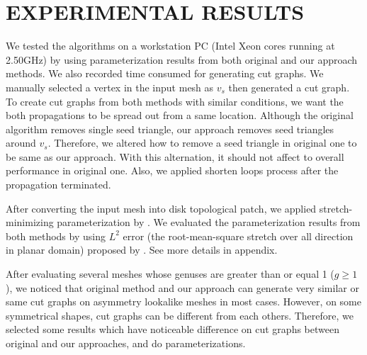 \documentclass[a4paper,twoside]{article}
\begin{document}
\section{\uppercase{Experimental Results}}
\label{sec:Experiment Results}
\noindent We tested the algorithms on a workstation PC (Intel Xeon cores running at 2.50GHz) by using parameterization results from both original and our approach methods. We also recorded time consumed for generating cut graphs. We manually selected a vertex in the input mesh as $v_s$ then generated a cut graph. To create cut graphs from both methods with similar conditions, we want the both propagations to be spread out from a same location. Although the original algorithm removes single seed triangle, our approach removes seed triangles around $v_s$. Therefore, we altered how to remove a seed triangle in original one to be same as our approach. With this alternation, it should not affect to overall performance in original one. Also, we applied shorten loops process after the propagation terminated.

After converting the input mesh into disk topological patch, we applied stretch-minimizing parameterization by \cite{Yoshizawa_SMI04}.  We evaluated the parameterization results from both methods by using $L^2$ error (the root-mean-square stretch over all direction in planar domain) proposed by \cite{Sander:2001:TMP:383259.383307,Sander:2002:SP:581896.581909}. See more details in appendix.   

After evaluating several meshes whose genuses are greater than or equal 1 ($g \geq 1$), we noticed that original method and our approach can generate very similar or same cut graphs on asymmetry lookalike meshes in most cases. However, on some symmetrical shapes, cut graphs can be different from each others. Therefore, we selected some results which have noticeable difference on cut graphs between original and our approaches, and do parameterizations.
\end{document}
